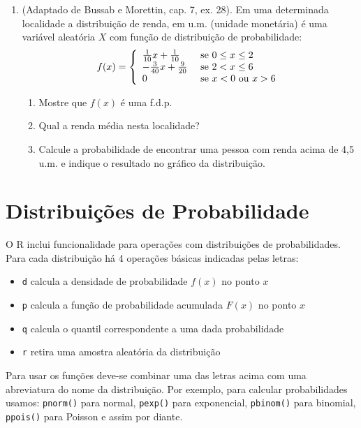\documentclass[10pt,a4paper]{book}
\providecommand{\tightlist}{%
  \setlength{\itemsep}{0pt}\setlength{\parskip}{0pt}}
\begin{document}
\begin{enumerate}
\def\labelenumi{\arabic{enumi}.}
\tightlist
\item
  (Adaptado de Bussab e Morettin, cap. 7, ex. 28). Em uma determinada
  localidade a distribuição de renda, em u.m. (unidade monetária) é uma
  variável aleatória \(X\) com função de distribuição de probabilidade:
  \[
  f(x) = \left\{ \begin{array}{ll}
      \frac{1}{10}x + \frac{1}{10} & \mbox{ se $0 \leq x \leq 2$} \cr
      -\frac{3}{40}x + \frac{9}{20} & \mbox{ se $ 2 < x \leq 6$} \cr
      0      &      \mbox{ se $x < 0$  ou  $x > 6$}
    \end{array} \right.
  \]

  \begin{enumerate}
  \def\labelenumii{\alph{enumii}.}
  \tightlist
  \item
    Mostre que \(f(x)\) é uma f.d.p.
  \item
    Qual a renda média nesta localidade?
  \item
    Calcule a probabilidade de encontrar uma pessoa com renda acima de
    4,5 u.m. e indique o resultado no gráfico da distribuição.
  \end{enumerate}
\end{enumerate}

\section{Distribuições de
Probabilidade}\label{distribuiuxe7uxf5es-de-probabilidade}

O R inclui funcionalidade para operações com distribuições de
probabilidades. Para cada distribuição há 4 operações básicas indicadas
pelas letras:

\begin{itemize}
\tightlist
\item
  \texttt{d} calcula a densidade de probabilidade \(f(x)\) no ponto
  \(x\)
\item
  \texttt{p} calcula a função de probabilidade acumulada \(F(x)\) no
  ponto \(x\)
\item
  \texttt{q} calcula o quantil correspondente a uma dada probabilidade
\item
  \texttt{r} retira uma amostra aleatória da distribuição
\end{itemize}

Para usar os funções deve-se combinar uma das letras acima com uma
abreviatura do nome da distribuição. Por exemplo, para calcular
probabilidades usamos: \texttt{pnorm()} para normal, \texttt{pexp()}
para exponencial, \texttt{pbinom()} para binomial, \texttt{ppois()} para
Poisson e assim por diante.
\end{document}
